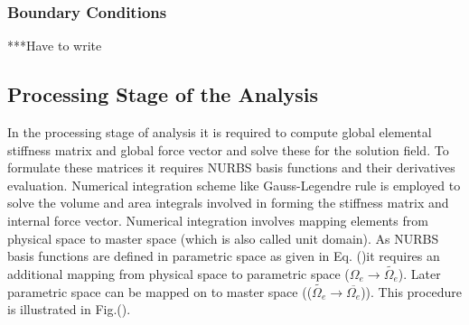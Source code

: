 \documentclass[12pt]{article}
\begin{document}
\subsubsection{Boundary Conditions}
***Have to write 


\subsection{Processing Stage of the Analysis}
In the processing stage of analysis it is required to compute global elemental stiffness matrix and global force vector and solve these for the solution field. To formulate these matrices it requires NURBS basis functions and their derivatives evaluation. Numerical integration scheme like Gauss-Legendre rule is employed to solve the volume and area integrals involved in forming the stiffness matrix and internal force vector. Numerical integration involves mapping elements from physical space to master space (which is also called unit domain). As NURBS basis functions are defined in parametric space as given in Eq. ()it requires an additional mapping from physical space to parametric space ($\Omega_e \rightarrow \widetilde{\Omega_e}$). Later parametric space can be mapped on to master space (($\widetilde{\Omega_e} \rightarrow \overline{\Omega_e}$)). This procedure is illustrated in Fig.().
\end{document}
